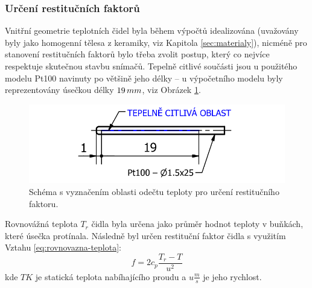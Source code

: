         \subsubsection{Určení restitučních faktorů}
            Vnitřní geometrie teplotních čidel byla během výpočtů idealizována (uvažovány byly jako homogenní tělesa z keramiky, viz Kapitola \ref{sec:materialy}), nicméně pro stanovení restitučních faktorů bylo třeba zvolit postup, který co nejvíce respektuje skutečnou stavbu snímačů. Tepelně citlivé součásti jsou u použitého modelu Pt100 navinuty po většině jeho délky – u výpočetního modelu byly reprezentovány úsečkou délky $19 \, mm$, viz Obrázek \ref{fig:odecet-tr}.

            \begin{figure} [ht!]
                \centering
                \includegraphics[width=.7\textwidth]{300_VYPOCETNI_MODEL/urceni_tr.png}
                \caption{Schéma s vyznačením oblasti odečtu teploty pro určení restitučního faktoru.}
                \label{fig:odecet-tr}
            \end{figure}

            Rovnovážná teplota $T_r$ čidla byla určena jako průměr hodnot teploty v buňkách, které úsečka protínala. Následně byl určen restituční faktor čidla s využitím \linebreak Vztahu \ref{eq:rovnovazna-teplota}:
            \begin{equation}
                f = 2 c_p \frac{T_r - T}{u ^2}
            \end{equation}
            \noindent kde $T \unit{K}$ je statická teplota nabíhajícího proudu a $u \unit{\frac{m}{s}}$ je jeho rychlost.

        
        